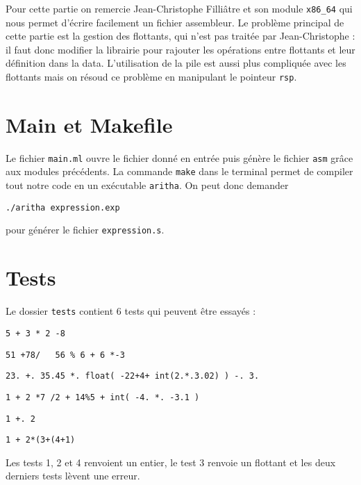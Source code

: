 \documentclass{scrartcl}
\begin{document}
Pour cette partie on remercie Jean-Christophe Filliâtre et son module \texttt{x86\_64} qui nous permet d'écrire facilement un fichier assembleur. Le problème principal de cette partie est la gestion des flottants, qui n'est pas traitée par Jean-Christophe : il faut donc modifier la librairie pour rajouter les opérations entre flottants et leur définition dans la data. L'utilisation de la pile est aussi plus compliquée avec les flottants mais on résoud ce problème en manipulant le pointeur \texttt{rsp}.



\section{Main et Makefile}

Le fichier \texttt{main.ml} ouvre le fichier donné en entrée puis génère le fichier \texttt{asm} grâce aux modules précédents. La commande \texttt{make} dans le terminal permet de compiler tout notre code en un exécutable \texttt{aritha}. On peut donc demander
\begin{verbatim}
./aritha expression.exp
\end{verbatim}
pour générer le fichier \texttt{expression.s}.



\section{Tests}

Le dossier \texttt{tests} contient 6 tests qui peuvent être essayés :
\begin{verbatim}
5 + 3 * 2 -8
\end{verbatim}
\begin{verbatim}
51 +78/   56 % 6 + 6 *-3
\end{verbatim}
\begin{verbatim}
23. +. 35.45 *. float( -22+4+ int(2.*.3.02) ) -. 3.
\end{verbatim}
\begin{verbatim}
1 + 2 *7 /2 + 14%5 + int( -4. *. -3.1 )
\end{verbatim}
\begin{verbatim}
1 +. 2
\end{verbatim}
\begin{verbatim}
1 + 2*(3+(4+1)
\end{verbatim}
Les tests 1, 2 et 4 renvoient un entier, le test 3 renvoie un flottant et les deux derniers tests lèvent une erreur.
\end{document}
